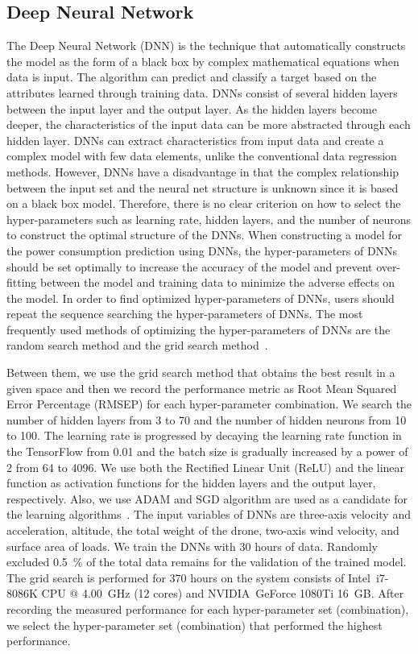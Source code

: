 \documentclass[journal]{./template/IEEEtran}
\begin{document}
\subsection{Deep Neural Network}

The Deep Neural Network (DNN) is the technique that automatically constructs the model as the form of a black box by complex mathematical equations when data is input.
The algorithm can predict and classify a target based on the attributes learned through training data. 
DNNs consist of several hidden layers between the input layer and the output layer.
As the hidden layers become deeper, the characteristics of the input data can be more abstracted through each hidden layer.
DNNs can extract characteristics from input data and create a complex model with few data elements, unlike the conventional data regression methods.
However, DNNs have a disadvantage in that the complex relationship between the input set and the neural net structure is unknown since it is based on a black box model. 
Therefore, there is no clear criterion on how to select the hyper-parameters such as learning rate, hidden layers, and the number of neurons to construct the optimal structure of the DNNs. 
When constructing a model for the power consumption prediction using DNNs, the hyper-parameters of DNNs should be set optimally to increase the accuracy of the model and prevent over-fitting between the model and training data to minimize the adverse effects on the model.
In order to find optimized hyper-parameters of DNNs, users should repeat the sequence searching the hyper-parameters of DNNs. 
The most frequently used methods of optimizing the hyper-parameters of DNNs are the random search method and the grid search method~\cite{ref_16}. 

Between them, we use the grid search method that obtains the best result in a given space and then we record the performance metric as Root Mean Squared Error Percentage (RMSEP) for each hyper-parameter combination.
We search the number of hidden layers from 3 to 70 and the number of hidden neurons from 10 to 100. 
The learning rate is progressed by decaying the learning rate function in the TensorFlow from 0.01 and the batch size is gradually increased by a power of 2 from 64 to 4096.
We use both the Rectified Linear Unit (ReLU) and the linear function as activation functions for the hidden layers and the output layer, respectively. 
Also, we use ADAM and SGD algorithm are used as a candidate for the learning algorithms~\cite{ref_17}. 
The input variables of DNNs are three-axis velocity and acceleration, altitude, the total weight of the drone, two-axis wind velocity, and surface area of loads. 
We train the DNNs with 30 hours of data. Randomly excluded 0.5~\% of the total data remains for the validation of the trained model.
The grid search is performed for 370 hours on the system consists of Intel\textregistered ~i7-8086K CPU @ 4.00~GHz (12 cores) and NVIDIA\textregistered ~GeForce 1080Ti 16~GB.
After recording the measured performance for each hyper-parameter set (combination), we select the hyper-parameter set (combination) that performed the highest performance.
\end{document}
